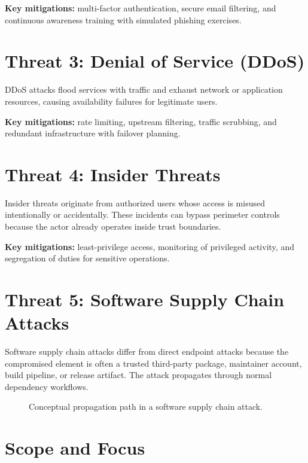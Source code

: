 \textbf{Key mitigations:} multi-factor authentication, secure email filtering,
and continuous awareness training with simulated phishing exercises.

\section{Threat 3: Denial of Service (DDoS)}

DDoS attacks flood services with traffic and exhaust network or application resources,
causing availability failures for legitimate users.

\textbf{Key mitigations:} rate limiting, upstream filtering, traffic scrubbing,
and redundant infrastructure with failover planning.

\section{Threat 4: Insider Threats}

Insider threats originate from authorized users whose access is misused intentionally or
accidentally. These incidents can bypass perimeter controls because the actor already operates
inside trust boundaries.

\textbf{Key mitigations:} least-privilege access, monitoring of privileged activity,
and segregation of duties for sensitive operations.

\section{Threat 5: Software Supply Chain Attacks}

Software supply chain attacks differ from direct endpoint attacks because the compromised
element is often a trusted third-party package, maintainer account, build pipeline,
or release artifact. The attack propagates through normal dependency workflows.

\begin{figure}[htbp]
\centering
{}
\caption{Conceptual propagation path in a software supply chain attack.}
\label{fig:supply-chain-path}
\end{figure}

\section{Scope and Focus}

